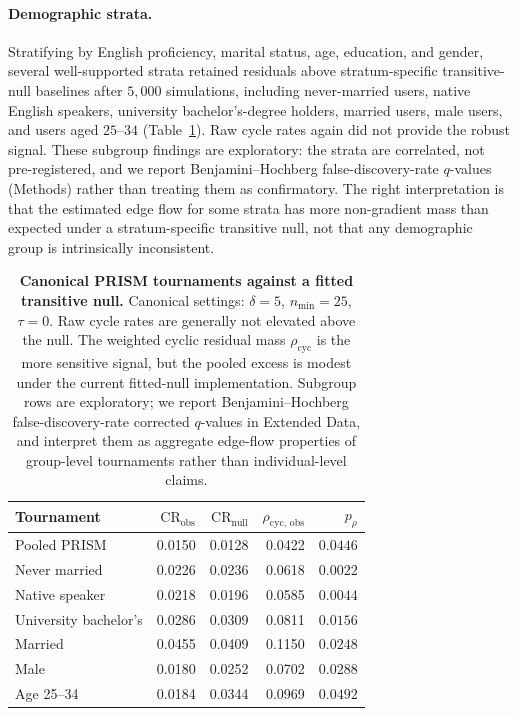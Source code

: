 \documentclass[10pt]{article}
\theoremstyle{definition}
\theoremstyle{remark}
\begin{document}
\paragraph{Demographic strata.} Stratifying by English proficiency, marital status, age, education, and gender, several well-supported strata retained residuals above stratum-specific transitive-null baselines after $5{,}000$ simulations, including never-married users, native English speakers, university bachelor's-degree holders, married users, male users, and users aged $25$--$34$ (Table~\ref{tab:strata}). Raw cycle rates again did not provide the robust signal. These subgroup findings are exploratory: the strata are correlated, not pre-registered, and we report Benjamini--Hochberg false-discovery-rate $q$-values (Methods) rather than treating them as confirmatory. The right interpretation is that the estimated edge flow for some strata has more non-gradient mass than expected under a stratum-specific transitive null, not that any demographic group is intrinsically inconsistent.

\begin{table}[h]
\centering
\small
\begin{tabular}{@{}lrrrr@{}}
\toprule
\textbf{Tournament} & $\mathrm{CR}_{\mathrm{obs}}$ & $\mathrm{CR}_{\mathrm{null}}$ & $\rho_{\mathrm{cyc,\,obs}}$ & $p_{\rho}$ \\
\midrule
Pooled PRISM            & 0.0150 & 0.0128 & 0.0422 & $0.0446$ \\
Never married           & 0.0226 & 0.0236 & 0.0618 & $0.0022$ \\
Native speaker          & 0.0218 & 0.0196 & 0.0585 & $0.0044$ \\
University bachelor's   & 0.0286 & 0.0309 & 0.0811 & $0.0156$ \\
Married                 & 0.0455 & 0.0409 & 0.1150 & $0.0248$ \\
Male                    & 0.0180 & 0.0252 & 0.0702 & $0.0288$ \\
Age 25--34              & 0.0184 & 0.0344 & 0.0969 & $0.0492$ \\
\bottomrule
\end{tabular}
\caption{\textbf{Canonical PRISM tournaments against a fitted transitive null.} Canonical settings: $\delta=5$, $n_{\min}=25$, $\tau=0$. Raw cycle rates are generally not elevated above the null. The weighted cyclic residual mass $\rho_{\mathrm{cyc}}$ is the more sensitive signal, but the pooled excess is modest under the current fitted-null implementation. Subgroup rows are exploratory; we report Benjamini--Hochberg false-discovery-rate corrected $q$-values in Extended Data, and interpret them as aggregate edge-flow properties of group-level tournaments rather than individual-level claims.}
\label{tab:strata}
\end{table}
\end{document}
